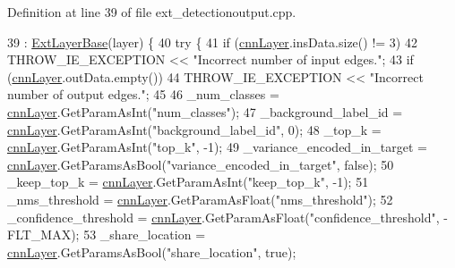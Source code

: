 Definition at line 39 of file ext\+\_\+detectionoutput.\+cpp.


\begin{DoxyCode}
39                                                         : \hyperlink{classInferenceEngine_1_1Extensions_1_1Cpu_1_1ExtLayerBase_affff0e8263ca26852ccf71d299d7b06a}{ExtLayerBase}(layer) \{
40         \textcolor{keywordflow}{try} \{
41             \textcolor{keywordflow}{if} (\hyperlink{classInferenceEngine_1_1Extensions_1_1Cpu_1_1ExtLayerBase_a1074cdccacb9e9ca6eec01bbc2f7ca4a}{cnnLayer}.insData.size() != 3)
42                 THROW\_IE\_EXCEPTION << \textcolor{stringliteral}{"Incorrect number of input edges."};
43             \textcolor{keywordflow}{if} (\hyperlink{classInferenceEngine_1_1Extensions_1_1Cpu_1_1ExtLayerBase_a1074cdccacb9e9ca6eec01bbc2f7ca4a}{cnnLayer}.outData.empty())
44                 THROW\_IE\_EXCEPTION << \textcolor{stringliteral}{"Incorrect number of output edges."};
45 
46             \_num\_classes = \hyperlink{classInferenceEngine_1_1Extensions_1_1Cpu_1_1ExtLayerBase_a1074cdccacb9e9ca6eec01bbc2f7ca4a}{cnnLayer}.GetParamAsInt(\textcolor{stringliteral}{"num\_classes"});
47             \_background\_label\_id = \hyperlink{classInferenceEngine_1_1Extensions_1_1Cpu_1_1ExtLayerBase_a1074cdccacb9e9ca6eec01bbc2f7ca4a}{cnnLayer}.GetParamAsInt(\textcolor{stringliteral}{"background\_label\_id"}, 0);
48             \_top\_k = \hyperlink{classInferenceEngine_1_1Extensions_1_1Cpu_1_1ExtLayerBase_a1074cdccacb9e9ca6eec01bbc2f7ca4a}{cnnLayer}.GetParamAsInt(\textcolor{stringliteral}{"top\_k"}, -1);
49             \_variance\_encoded\_in\_target = \hyperlink{classInferenceEngine_1_1Extensions_1_1Cpu_1_1ExtLayerBase_a1074cdccacb9e9ca6eec01bbc2f7ca4a}{cnnLayer}.GetParamsAsBool(\textcolor{stringliteral}{"variance\_encoded\_in\_target"}, \textcolor{keyword}{
      false});
50             \_keep\_top\_k = \hyperlink{classInferenceEngine_1_1Extensions_1_1Cpu_1_1ExtLayerBase_a1074cdccacb9e9ca6eec01bbc2f7ca4a}{cnnLayer}.GetParamAsInt(\textcolor{stringliteral}{"keep\_top\_k"}, -1);
51             \_nms\_threshold = \hyperlink{classInferenceEngine_1_1Extensions_1_1Cpu_1_1ExtLayerBase_a1074cdccacb9e9ca6eec01bbc2f7ca4a}{cnnLayer}.GetParamAsFloat(\textcolor{stringliteral}{"nms\_threshold"});
52             \_confidence\_threshold = \hyperlink{classInferenceEngine_1_1Extensions_1_1Cpu_1_1ExtLayerBase_a1074cdccacb9e9ca6eec01bbc2f7ca4a}{cnnLayer}.GetParamAsFloat(\textcolor{stringliteral}{"confidence\_threshold"}, -FLT\_MAX);
53             \_share\_location = \hyperlink{classInferenceEngine_1_1Extensions_1_1Cpu_1_1ExtLayerBase_a1074cdccacb9e9ca6eec01bbc2f7ca4a}{cnnLayer}.GetParamsAsBool(\textcolor{stringliteral}{"share\_location"}, \textcolor{keyword}{true});

\end{DoxyCode}
